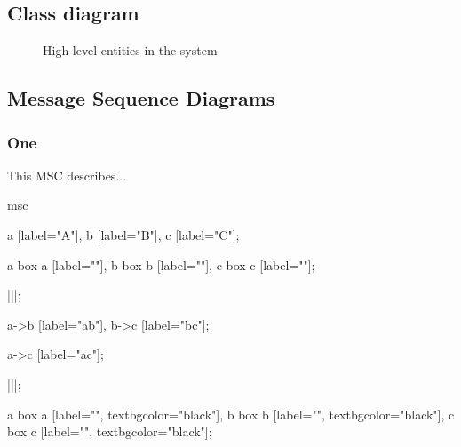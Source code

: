 \subsection{Class diagram}
	\begin{figure}
		\centering
		\caption{High-level entities in the system}
		\label{fig:analysis-model}
	\end{figure}

\subsection{Message Sequence Diagrams}
	\subsubsection{One}
		This MSC describes...
		\begin{msc}
			msc
			{

				a [label="A"],
				b [label="B"],
				c [label="C"];

				a box a [label=""],
				b box b [label=""],
				c box c [label=""];

				|||;
				
				a->b [label="ab"],
				b->c [label="bc"];
				
				a->c [label="ac"];

				|||;

				a box a [label="", textbgcolor="black"],
				b box b [label="", textbgcolor="black"],
				c box c [label="", textbgcolor="black"];

			}
		\end{msc}